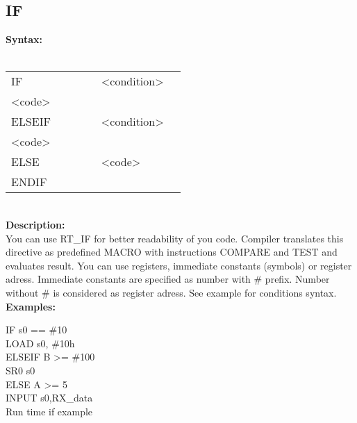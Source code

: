                 \subsection{IF}
                    \textbf{Syntax:}\\
                    \\ {
                        \texttt{}
                            \begin{tabular}[h!]{llll}
                                { \color{highlight_directive} IF } & \verb'     ' &
                                { \color{highlight_constant} <condition> }\\
                                { \color{highlight_symbol} <code> }\\
                                { \color{highlight_directive} ELSEIF } & \verb'     ' &
                                { \color{highlight_constant} <condition> }\\
                                { \color{highlight_symbol} <code> }\\
                                { \color{highlight_directive} ELSE } & \verb'     ' &
                                { \color{highlight_symbol} <code> }\\
                                { \color{highlight_directive} ENDIF }
                            \end{tabular}
                        }\\
                    \textbf{Description:}\\
                    You can use RT\_IF for better readability of you code. Compiler translates this directive as predefined MACRO with instructions COMPARE and TEST and
                    evaluates result. You can use registers, immediate constants (symbols) or register adress. Immediate constants are specified as number with \# prefix.
                    Number without \# is considered as register adress. See example for conditions syntax.
                    \textbf{Examples:}\\
                            \begin{code}[h!]
                                    { \color{highlight_directive} IF }
                                    { \color{highlight_constant}   s0 == \#10 }\\
                                    { \color{highlight_instruction}   LOAD  s0, \#10h }\\
                                    { \color{highlight_comment}  ELSEIF} { \color{highlight_constant}   B >= \#100 }\\
                                    { \color{highlight_instruction}   SR0   s0 }\\
                                    { \color{highlight_comment}  ELSE} { \color{highlight_constant}   A >= 5 }\\
                                    { \color{highlight_instruction}   INPUT   s0,RX\_data }\\
                                \caption{Run time if example}
                        \end{code}
